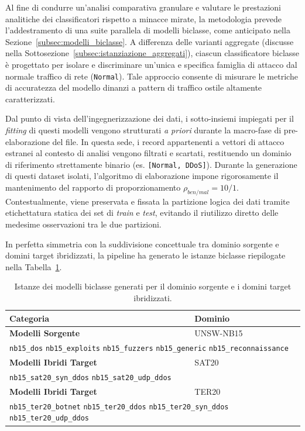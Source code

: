 Al fine di condurre un'analisi comparativa granulare e valutare le prestazioni analitiche dei classificatori rispetto a minacce mirate, la metodologia prevede l'addestramento di una suite parallela di modelli biclasse, come anticipato nella Sezione~\ref{subsec:modelli_biclasse}. 
A differenza delle varianti aggregate (discusse nella Sottosezione~\ref{subsec:istanziazione_aggregati}), ciascun classificatore biclasse è progettato per isolare e discriminare un'unica e specifica famiglia di attacco dal normale traffico di rete (\texttt{Normal}). 
Tale approccio consente di misurare le metriche di accuratezza del modello dinanzi a pattern di traffico ostile altamente caratterizzati.

Dal punto di vista dell'ingegnerizzazione dei dati, i sotto-insiemi impiegati per il \textit{fitting} di questi modelli vengono strutturati \textit{a priori} durante la macro-fase di pre-elaborazione del file. 
In questa sede, i record appartenenti a vettori di attacco estranei al contesto di analisi vengono filtrati e scartati, restituendo un dominio di riferimento strettamente binario (es. \texttt{[Normal, DDoS]}). 
Durante la generazione di questi dataset isolati, l'algoritmo di elaborazione impone rigorosamente il mantenimento del rapporto di proporzionamento $\rho_{ben/mal} = 10/1$. 
Contestualmente, viene preservata e fissata la partizione logica dei dati tramite etichettatura statica dei set di \textit{train} e \textit{test}, evitando il riutilizzo diretto delle medesime osservazioni tra le due partizioni.

In perfetta simmetria con la suddivisione concettuale tra dominio sorgente e domini target ibridizzati, la pipeline ha generato le istanze biclasse riepilogate nella Tabella~\ref{tab:biclass_models_summary}.

\begin{table}[H]
    \centering
    \small
    \caption{Istanze dei modelli biclasse generati per il dominio sorgente e i domini target ibridizzati.}
    \label{tab:biclass_models_summary}
    \begin{tabularx}{\textwidth}{l >{\raggedright\arraybackslash}X}
        \toprule
        \textbf{Categoria} & \textbf{Dominio} \\
        \midrule
        \textbf{Modelli Sorgente} & UNSW-NB15 \\
        \multicolumn{2}{l}{\texttt{nb15\_dos} \quad \texttt{nb15\_exploits} \quad \texttt{nb15\_fuzzers} \quad \texttt{nb15\_generic} \quad \texttt{nb15\_reconnaissance}} \\
        \textbf{Modelli Ibridi Target} & SAT20 \\
        \multicolumn{2}{l}{\texttt{nb15\_sat20\_syn\_ddos} \quad \texttt{nb15\_sat20\_udp\_ddos}} \\
        \textbf{Modelli Ibridi Target} & TER20 \\
        \multicolumn{2}{l}{\texttt{nb15\_ter20\_botnet} \quad \texttt{nb15\_ter20\_ddos} \quad \texttt{nb15\_ter20\_syn\_ddos} \quad \texttt{nb15\_ter20\_udp\_ddos}} \\
        \bottomrule
    \end{tabularx}
\end{table}


